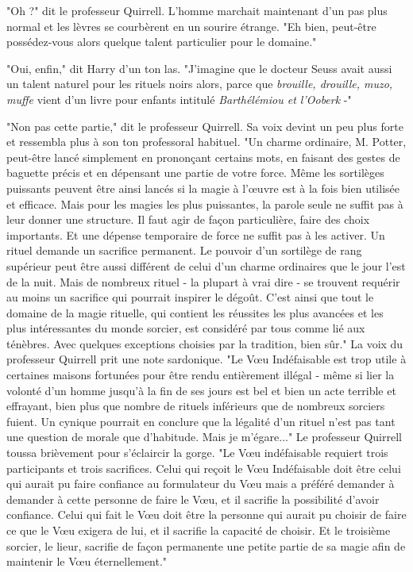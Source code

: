 "Oh ?" dit le professeur Quirrell. L'homme marchait maintenant d'un pas plus normal et les lèvres se courbèrent en un sourire étrange. "Eh bien, peut-être possédez-vous alors quelque talent particulier pour le domaine."

"Oui, enfin," dit Harry d'un ton las. "J'imagine que le docteur Seuss avait aussi un talent naturel pour les rituels noirs alors, parce que \emph{brouille, drouille, muzo, muffe}  vient d'un livre pour enfants intitulé \emph{Barthélémiou et l'Ooberk}  -"

"Non pas cette partie," dit le professeur Quirrell. Sa voix devint un peu plus forte et ressembla plus à son ton professoral habituel. "Un charme ordinaire, M. Potter, peut-être lancé simplement en prononçant certains mots, en faisant des gestes de baguette précis et en dépensant une partie de votre force. Même les sortilèges puissants peuvent être ainsi lancés si la magie à l'œuvre est à la fois bien utilisée et efficace. Mais pour les magies les plus puissantes, la parole seule ne suffit pas à leur donner une structure. Il faut agir de façon particulière, faire des choix importants. Et une dépense temporaire de force ne suffit pas à les activer. Un rituel demande un sacrifice permanent. Le pouvoir d'un sortilège de rang supérieur peut être aussi différent de celui d'un charme ordinaires que le jour l'est de la nuit. Mais de nombreux rituel - la plupart à vrai dire - se trouvent requérir au moins un sacrifice qui pourrait inspirer le dégoût. C'est ainsi que tout le domaine de la magie rituelle, qui contient les réussites les plus avancées et les plus intéressantes du monde sorcier, est considéré par tous comme lié aux ténèbres. Avec quelques exceptions choisies par la tradition, bien sûr." La voix du professeur Quirrell prit une note sardonique. "Le Vœu Indéfaisable est trop utile à certaines maisons fortunées pour être rendu entièrement illégal - même si lier la volonté d'un homme jusqu'à la fin de ses jours est bel et bien un acte terrible et effrayant, bien plus que nombre de rituels inférieurs que de nombreux sorciers fuient. Un cynique pourrait en conclure que la légalité d'un rituel n'est pas tant une question de morale que d'habitude. Mais je m'égare..." Le professeur Quirrell toussa brièvement pour s'éclaircir la gorge. "Le Vœu indéfaisable requiert trois participants et trois sacrifices. Celui qui reçoit le Vœu Indéfaisable doit être celui qui aurait pu faire confiance au formulateur du Vœu mais a préféré demander à demander à cette personne de faire le Vœu, et il sacrifie la possibilité d'avoir confiance. Celui qui fait le Vœu doit être la personne qui aurait pu choisir de faire ce que le Vœu exigera de lui, et il sacrifie la capacité de choisir. Et le troisième sorcier, le lieur, sacrifie de façon permanente une petite partie de sa magie afin de maintenir le Vœu éternellement."


